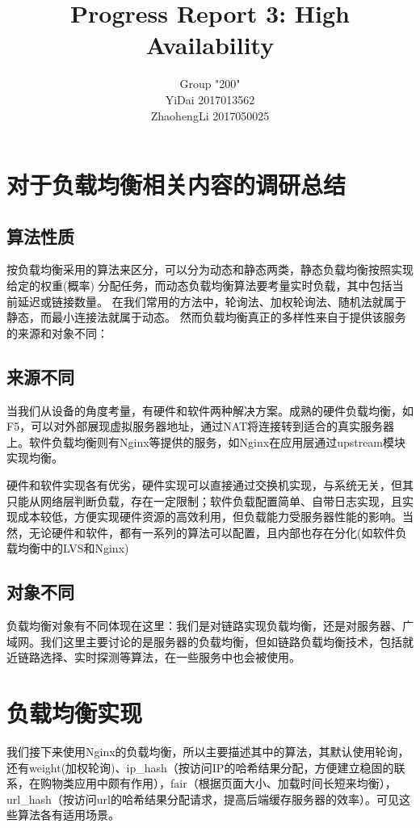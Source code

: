 \documentclass{article}
\title{Progress Report 3: High Availability}
\author{Group "200"\\YiDai 2017013562\\ZhaohengLi 2017050025}
\begin{document}
\maketitle



\section{对于负载均衡相关内容的调研总结}
\subsection{算法性质}
按负载均衡采用的算法来区分，可以分为动态和静态两类，静态负载均衡按照实现给定的权重(概率)
分配任务，而动态负载均衡算法要考量实时负载，其中包括当前延迟或链接数量。
在我们常用的方法中，轮询法、加权轮询法、随机法就属于静态，而最小连接法就属于动态。
然而负载均衡真正的多样性来自于提供该服务的来源和对象不同：
\subsection{来源不同}
当我们从设备的角度考量，有硬件和软件两种解决方案。成熟的硬件负载均衡，如F5，可以对外部展现虚拟服务器地址，通过NAT将连接转到适合的真实服务器上。软件负载均衡则有Nginx等提供的服务，如Nginx在应用层通过upstream模块实现均衡。

硬件和软件实现各有优劣，硬件实现可以直接通过交换机实现，与系统无关，但其只能从网络层判断负载，存在一定限制；软件负载配置简单、自带日志实现，且实现成本较低，方便实现硬件资源的高效利用，但负载能力受服务器性能的影响。当然，无论硬件和软件，都有一系列的算法可以配置，且内部也存在分化(如软件负载均衡中的LVS和Nginx)
\subsection{对象不同}
负载均衡对象有不同体现在这里：我们是对链路实现负载均衡，还是对服务器、广域网。我们这里主要讨论的是服务器的负载均衡，但如链路负载均衡技术，包括就近链路选择、实时探测等算法，在一些服务中也会被使用。




\section{负载均衡实现}
我们接下来使用Nginx的负载均衡，所以主要描述其中的算法，其默认使用轮询，还有weight(加权轮询)、ip\_hash（按访问IP的哈希结果分配，方便建立稳固的联系，在购物类应用中颇有作用），fair（根据页面大小、加载时间长短来均衡），url\_hash（按访问url的哈希结果分配请求，提高后端缓存服务器的效率）。可见这些算法各有适用场景。
\end{document}
